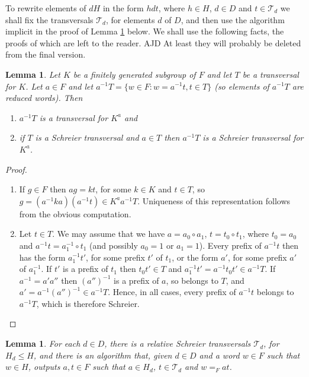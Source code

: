 \documentclass[a4paper,12pt]{article}
\newtheorem{lemma}[theorem]{Lemma}
\numberwithin{equation}{section}
\numberwithin{figure}{section}
\newcommand{\cT}{\mathcal{T}}
\newcommand{\be}{\begin{enumerate}}
\newcommand{\ee}{\end{enumerate}}
\newenvironment{ajd1}{\noindent\color{red} AJD }{}
\newcommand{\ajd}[1]{\begin{ajd1} #1 \end{ajd1}}
\begin{document}
To rewrite elements of $dH$ in the form $hdt$, where $h\in H$, 
$d\in D$ and $t\in \cT_d$ 
we shall fix the transversals $\cT_d$, for elements $d$ of $D$, and
then use the algorithm implicit in the proof of Lemma \ref{lem:reltran}
below. We shall use the following facts, the proofs of which
are left to the reader. \ajd{At least they will probably be deleted 
from  the final version.}
\begin{lemma}\label{lem:conjtran}
Let $K$ be a finitely generated subgroup of $F$ and let $T$ be
a transversal for $K$. Let $a\in F$ and let 
$a^{-1}T=\{w\in F:w=a^{-1}t, t\in T\}$ 
(so elements of $a^{-1}T$ are reduced words). 
  Then 
\be
\item $a^{-1}T$ is a transversal for $K^a$ and 
\item if $T$ is a Schreier transversal and $a\in T$ 
then $a^{-1}T$ is a Schreier  transversal for $K^a$.
\ee
\end{lemma}
\begin{proof}
\be
\item If $g\in F$ then $ag=kt$, for some $k\in K$ and $t\in T$, 
so $g=(a^{-1}ka)(a^{-1}t)\in K^aa^{-1}T$. Uniqueness of this representation
follows from the obvious computation.
\item Let $t\in T$. 
We may assume that we have $a=a_0\circ a_1$, $t=t_0\circ t_1$, where
$t_0=a_0$ and $a^{-1}t=a_1^{-1}\circ t_1$ (and possibly $a_0=1$ or $a_1=1$).  
Every prefix of $a^{-1}t$ then has the form $a_1^{-1}t'$, for 
some prefix $t'$ of $t_1$, or the form $a'$, for some prefix $a'$ of 
$a_1^{-1}$.  If $t'$ is a prefix of $t_1$ then $t_0t'\in T$ and 
$a_1^{-1}t'=  a^{-1}t_0t'\in a^{-1}T$. If $a^{-1}=a'a''$ then 
$(a'')^{-1}$ is a prefix of $a$, so belongs to $T$, and $a'=a^{-1}(a'')^{-1}
\in a^{-1}T$. Hence, in all cases, every prefix of $a^{-1}t$ belongs
to $a^{-1}T$, which is therefore Schreier.
\ee
\end{proof}
\begin{lemma}\label{lem:reltran}
For each $d\in D$, there is a 
relative Schreier transversals $\cT_d$, for $H_d\le H$, and there is  
 an algorithm that, given $d\in D$ and a word $w \in F$ such that 
$w\in H$, outputs $a,t\in F$ such that $a\in H_d$, $t\in \cT_d$ and 
$w=_F at$. 
\end{lemma}
\end{document}
